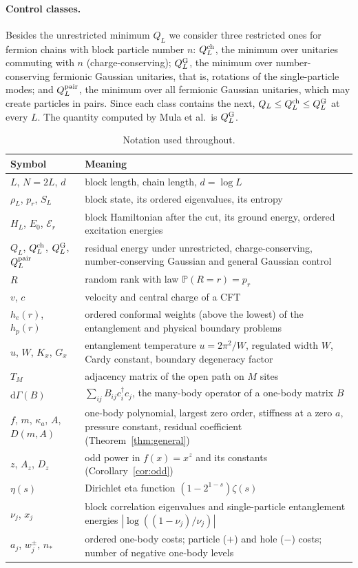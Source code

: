 \documentclass[11pt,a4paper]{article}
\theoremstyle{remark}
\newcommand{\Prob}{\mathbb P}
\newcommand{\dd}{\mathrm d}
\begin{document}
\paragraph{Control classes.} Besides the unrestricted minimum $Q_L$ we consider three restricted ones for fermion chains with block particle number $n$: $Q_L^{\rm ch}$, the minimum over unitaries commuting with $n$ (charge-conserving); $Q_L^{\rm G}$, the minimum over number-conserving fermionic Gaussian unitaries, that is, rotations of the single-particle modes; and $Q_L^{\rm pair}$, the minimum over all fermionic Gaussian unitaries, which may create particles in pairs. Since each class contains the next, $Q_L\le Q_L^{\rm ch}\le Q_L^{\rm G}$ at every $L$. The quantity computed by Mula et al.\ is $Q_L^{\rm G}$.

\begin{table}[htbp]\centering\small
\caption{Notation used throughout.}\label{tab:notation}
\begin{tabular}{>{\raggedright}p{.21\linewidth}p{.71\linewidth}}
\toprule
Symbol & Meaning\\
\midrule
$L$, $N=2L$, $d$ & block length, chain length, $d=\log L$\\
$\rho_L$, $p_r$, $S_L$ & block state, its ordered eigenvalues, its entropy\\
$H_L$, $E_0$, $\mathcal E_r$ & block Hamiltonian after the cut, its ground energy, ordered excitation energies\\
$Q_L$, $Q_L^{\rm ch}$, $Q_L^{\rm G}$, $Q_L^{\rm pair}$ & residual energy under unrestricted, charge-conserving, number-conserving Gaussian and general Gaussian control\\
$R$ & random rank with law $\Prob(R=r)=p_r$\\
$v$, $c$ & velocity and central charge of a CFT\\
$h_e(r)$, $h_p(r)$ & ordered conformal weights (above the lowest) of the entanglement and physical boundary problems\\
$u$, $W$, $K_x$, $G_x$ & entanglement temperature $u=2\pi^2/W$, regulated width $W$, Cardy constant, boundary degeneracy factor\\
$T_M$ & adjacency matrix of the open path on $M$ sites\\
$\dd\Gamma(B)$ & $\sum_{ij}B_{ij}c_i^\dagger c_j$, the many-body operator of a one-body matrix $B$\\
$f$, $m$, $\kappa_a$, $A$, $D(m,A)$ & one-body polynomial, largest zero order, stiffness at a zero $a$, pressure constant, residual coefficient (Theorem~\ref{thm:general})\\
$z$, $A_z$, $D_z$ & odd power in $f(x)=x^z$ and its constants (Corollary~\ref{cor:odd})\\
$\eta(s)$ & Dirichlet eta function $(1-2^{1-s})\zeta(s)$\\
$\nu_j$, $x_j$ & block correlation eigenvalues and single-particle entanglement energies $|\log((1-\nu_j)/\nu_j)|$\\
$a_j$, $w_j^\pm$, $n_*$ & ordered one-body costs; particle ($+$) and hole ($-$) costs; number of negative one-body levels\\
\bottomrule
\end{tabular}
\end{table}
\end{document}

